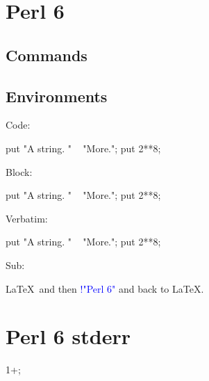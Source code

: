 \documentclass[11pt]{article}
\begin{document}
\section*{Perl 6}

\subsection*{Commands}




\printpythontex




\subsection*{Environments}

Code:
\begin{perlsixcode}
put "A string. " ~ "More.";
put 2**8;
\end{perlsixcode}

Block:
\begin{perlsixblock}
put "A string. " ~ "More.";
put 2**8;
\end{perlsixblock}

\printpythontex

Verbatim:
\begin{perlsixverbatim}
put "A string. " ~ "More.";
put 2**8;
\end{perlsixverbatim}

Sub:
\begin{perlsixsub}
\LaTeX\ and then \textcolor{blue}{!{"Perl 6"}} and back to \LaTeX.
\end{perlsixsub}


\section*{Perl 6 stderr}



\stderrpythontex[][breaklines, breakafter=\\/]


\begin{perlsixblock}[err2][numbers=left]
1+;
\end{perlsixblock}
\end{document}
